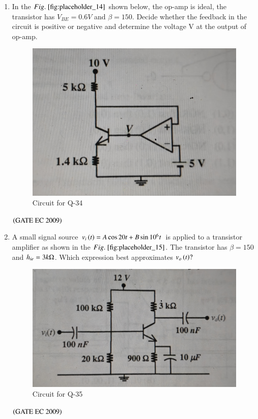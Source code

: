 \documentclass[journal,12pt,onecolumn]{IEEEtran}
\theoremstyle{remark}
\begin{document}
\begin{enumerate}[start=1, label={Q\arabic*.}]
\item In the $\figref{fig:placeholder_14}$ shown below, the op-amp is ideal, the transistor has $V_{BE} = 0.6 V$ and $\beta = 150$. Decide whether the feedback in the circuit is positive or negative and determine the voltage V at the output of op-amp.     
\begin{figure}[H]
    \centering
    \includegraphics[width=0.5\columnwidth]{figs/img_14.jpg}
    \caption{Circuit for Q-34}
    \label{fig:placeholder_14}
\end{figure}
\begin{enumerate}
\end{enumerate}
\hfill $\left(\text{GATE EC 2009}\right)$

\item A small signal source $v_i\left(t\right) = A\cos{20t} + B \sin{10^6t}$ is applied to a transistor amplifier as shown in the $\figref{fig:placeholder_15}$. The transistor has $\beta = 150$ and $h_{ie} = 3k\ohm$. Which expression best approximates $v_o\left(t\right) ?$
\begin{figure}[H]
    \centering
    \includegraphics[width=0.5\columnwidth]{figs/img_15.jpg}
    \caption{Circuit for Q-35}
    \label{fig:placeholder_15}
\end{figure}
\begin{enumerate}
\end{enumerate}
\hfill $\left(\text{GATE EC 2009}\right)$


\end{enumerate}
\end{document}
